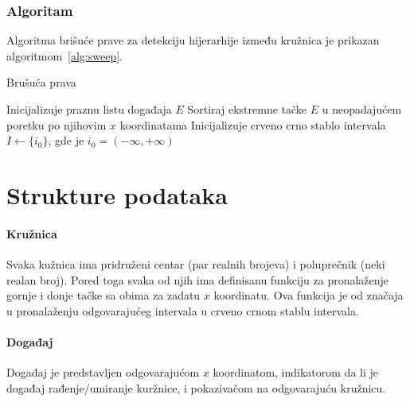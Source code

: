\documentclass[a4paper,12pt]{article}
\begin{document}
\subsubsection{Algoritam}
\label{subsub:sweep}

Algoritma brišuće prave za detekciju hijerarhije između kružnica je prikazan algoritmom~\ref{alg:sweep}.

\begin{algorithm}
    \caption{Brušuća prava}\label{alg:sweep}
    Inicijalizuje praznu listu događaja $E$\;
    Sortiraj ekstremne tačke $E$ u neopadajućem poretku po njihovim $x$ koordinatama\;
    Inicijalizuje crveno crno stablo intervala $I \gets \{i_0\}$, gde je $i_0 = (-\infty, +\infty)$\;
\end{algorithm}

\section{Strukture podataka}
\label{sec:data}

\paragraph{Kružnica}
\label{par:circ}
Svaka kužnica ima pridruženi centar (par realnih brojeva) i poluprečnik (neki realan broj). Pored toga svaka od njih ima definisanu funkciju za pronalaženje gornje i donje tačke sa obima za zadatu $x$ koordinatu. Ova funkcija je od značaja u pronalaženju odgovarajućeg intervala u crveno crnom stablu intervala.

\paragraph{Događaj}
\label{par:event}
Događaj je predstavljen odgovarajućom $x$ koordinatom, indikatorom da li je događaj rađenje/umiranje kuržnice, i pokazivačom na odgovarajuću kružnicu.
\end{document}
